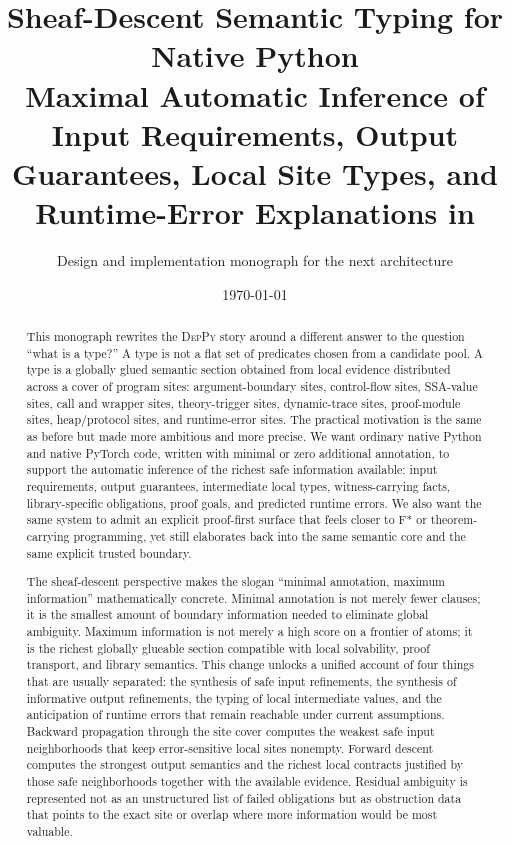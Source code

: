 \documentclass[11pt]{report}
\title{Sheaf-Descent Semantic Typing for Native Python\\
\large Maximal Automatic Inference of Input Requirements, Output Guarantees, Local Site Types, and Runtime-Error Explanations in \DepPy}
\author{Design and implementation monograph for the next \DepPy{} architecture}
\date{\today}
\newcommand{\DepPy}{\textsc{DepPy}}
\theoremstyle{definition}
\theoremstyle{plain}
\begin{document}
\maketitle
\tableofcontents



\begin{abstract}
This monograph rewrites the \DepPy{} story around a different answer to the
question ``what is a type?'' A type is not a flat set of predicates chosen from a
candidate pool. A type is a globally glued semantic section obtained from local
evidence distributed across a cover of program sites: argument-boundary sites,
control-flow sites, SSA-value sites, call and wrapper sites, theory-trigger
sites, dynamic-trace sites, proof-module sites, heap/protocol sites, and
runtime-error sites. The practical motivation is the same as before but made
more ambitious and more precise. We want ordinary native Python and native
PyTorch code, written with minimal or zero additional annotation, to support the
automatic inference of the richest safe information available: input
requirements, output guarantees, intermediate local types, witness-carrying
facts, library-specific obligations, proof goals, and predicted runtime errors.
We also want the same system to admit an explicit proof-first surface that feels
closer to F* or theorem-carrying programming, yet still elaborates back into the
same semantic core and the same explicit trusted boundary.

The sheaf-descent perspective makes the slogan ``minimal annotation, maximum
information'' mathematically concrete. Minimal annotation is not merely fewer
clauses; it is the smallest amount of boundary information needed to eliminate
global ambiguity. Maximum information is not merely a high score on a frontier
of atoms; it is the richest globally glueable section compatible with local
solvability, proof transport, and library semantics. This change unlocks a
unified account of four things that are usually separated: the synthesis of safe
input refinements, the synthesis of informative output refinements, the typing
of local intermediate values, and the anticipation of runtime errors that remain
reachable under current assumptions. Backward propagation through the site cover
computes the weakest safe input neighborhoods that keep error-sensitive local
sites nonempty. Forward descent computes the strongest output semantics and the
richest local contracts justified by those safe neighborhoods together with the
available evidence. Residual ambiguity is represented not as an unstructured
list of failed obligations but as obstruction data that points to the exact site
or overlap where more information would be most valuable.


\end{abstract}
\end{document}
